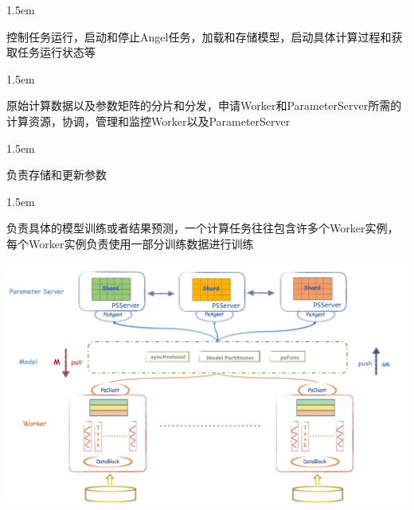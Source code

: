 \documentclass{article}
\begin{document}
\begin{mddefinitions}%


\begin{mdbmarginx}{}{}{}{1.5em}%
\begin{mddefdata}%
控制任务运行，启动和停止Angel任务，加载和存储模型，启动具体计算过程和获取任务运行状态等
\end{mddefdata}%
\end{mdbmarginx}%


\begin{mdbmarginx}{}{}{}{1.5em}%
\begin{mddefdata}%
原始计算数据以及参数矩阵的分片和分发，申请Worker和ParameterServer所需的计算资源，协调，管理和监控Worker以及ParameterServer
\end{mddefdata}%
\end{mdbmarginx}%


\begin{mdbmarginx}{}{}{}{1.5em}%
\begin{mddefdata}%
负责存储和更新参数
\end{mddefdata}%
\end{mdbmarginx}%


\begin{mdbmarginx}{}{}{}{1.5em}%
\begin{mddefdata}%
负责具体的模型训练或者结果预测，一个计算任务往往包含许多个Worker实例，每个Worker实例负责使用一部分训练数据进行训练%
\end{mddefdata}%
\end{mdbmarginx}%
\end{mddefinitions}%

\noindent{}\includegraphics[keepaspectratio=true,width=\dimmin{}{\dimwidth{0.90}}]{images/angel_architecture_1}{}
\end{document}
